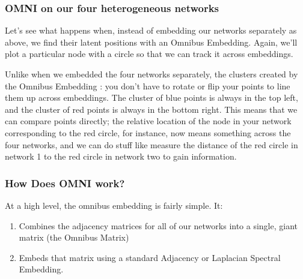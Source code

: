 \documentclass[letterpaper,10pt,english]{jupyterBook}
\begin{document}
\noindent{}


\subsubsection{OMNI on our four heterogeneous networks}
\label{\detokenize{representations/ch6/multigraph-representation-learning:omni-on-our-four-heterogeneous-networks}}
\sphinxAtStartPar
Let’s see what happens when, instead of embedding our networks separately as above, we find their latent positions with an Omnibus Embedding. Again, we’ll plot a particular node with a circle so that we can track it across embeddings.

\begin{sphinxVerbatim}[commandchars=\\\{\}]
   

  
  
\end{sphinxVerbatim}

\noindent{}

\sphinxAtStartPar
Unlike when we embedded the four networks separately, the clusters created by the Omnibus Embedding : you don’t have to rotate or flip your points to line them up across embeddings. The cluster of blue points is always in the top left, and the cluster of red points is always in the bottom right. This means that we can compare points directly; the relative location of the node in your network corresponding to the red circle, for instance, now means something across the four networks, and we can do stuff like measure the distance of the red circle in network 1 to the red circle in network two to gain information.


\subsubsection{How Does OMNI work?}
\label{\detokenize{representations/ch6/multigraph-representation-learning:how-does-omni-work}}
\sphinxAtStartPar
At a high level, the omnibus embedding is fairly simple. It:
\begin{enumerate}
%
\item {} 
\sphinxAtStartPar
Combines the adjacency matrices for all of our networks into a single, giant matrix (the Omnibus Matrix)

\item {} 
\sphinxAtStartPar
Embeds that matrix using a standard Adjacency or Laplacian Spectral Embedding.

\end{enumerate}
\end{document}
